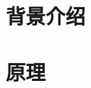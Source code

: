 \documentclass[10pt,a4paper]{article}
\begin{document}
\section{背景介绍}

\section{原理}









\end{document}
